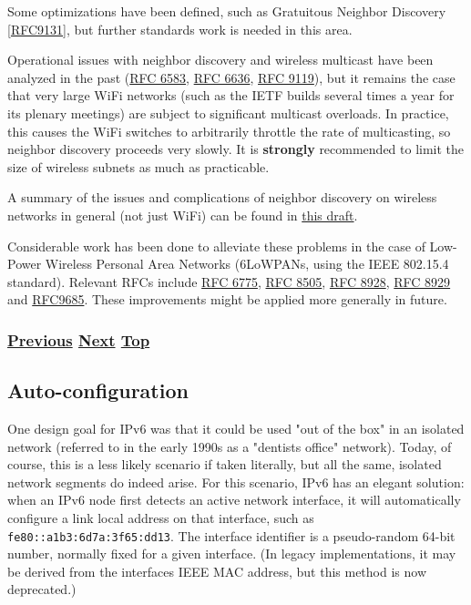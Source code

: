 \documentclass[
]{article}
\begin{document}
Some optimizations have been defined, such as Gratuitous Neighbor
Discovery {[}\href{https://www.rfc-editor.org/info/rfc9131}{RFC9131}{]},
but further standards work is needed in this area.

Operational issues with neighbor discovery and wireless multicast have
been analyzed in the past
(\href{https://www.rfc-editor.org/info/rfc6583}{RFC 6583},
\href{https://www.rfc-editor.org/info/rfc6636}{RFC 6636},
\href{https://www.rfc-editor.org/info/rfc9119}{RFC 9119}), but it
remains the case that very large WiFi networks (such as the IETF builds
several times a year for its plenary meetings) are subject to
significant multicast overloads. In practice, this causes the WiFi
switches to arbitrarily throttle the rate of multicasting, so neighbor
discovery proceeds very slowly. It is \textbf{strongly} recommended to
limit the size of wireless subnets as much as practicable.

A summary of the issues and complications of neighbor discovery on
wireless networks in general (not just WiFi) can be found in
\href{https://datatracker.ietf.org/doc/draft-ietf-6man-ipv6-over-wireless/}{this
draft}.

Considerable work has been done to alleviate these problems in the case
of Low-Power Wireless Personal Area Networks (6LoWPANs, using the IEEE
802.15.4 standard). Relevant RFCs include
\href{https://www.rfc-editor.org/info/rfc6775}{RFC 6775},
\href{https://www.rfc-editor.org/info/rfc8505}{RFC 8505},
\href{https://www.rfc-editor.org/info/rfc8928}{RFC 8928},
\href{https://www.rfc-editor.org/info/rfc8929}{RFC 8929} and
\href{https://www.rfc-editor.org/info/rfc9685}{RFC9685}. These
improvements might be applied more generally in future.

\subsubsection{\texorpdfstring{\hyperref[layer-2-functions]{Previous}
\hyperref[auto-configuration]{Next}
\hyperref[ipv6-basic-technology]{Top}}{Previous Next Top}}\label{previous-next-top-10}

\pagebreak

\subsection{Auto-configuration}\label{auto-configuration}

One design goal for IPv6 was that it could be used "out of the box" in
an isolated network (referred to in the early 1990s as a
"dentist\textquotesingle s office" network). Today, of course, this is a
less likely scenario if taken literally, but all the same, isolated
network segments do indeed arise. For this scenario, IPv6 has an elegant
solution: when an IPv6 node first detects an active network interface,
it will automatically configure a link local address on that interface,
such as \texttt{fe80::a1b3:6d7a:3f65:dd13}. The interface identifier is
a pseudo-random 64-bit number, normally fixed for a given interface. (In
legacy implementations, it may be derived from the
interface\textquotesingle s IEEE MAC address, but this method is now
deprecated.)
\end{document}
